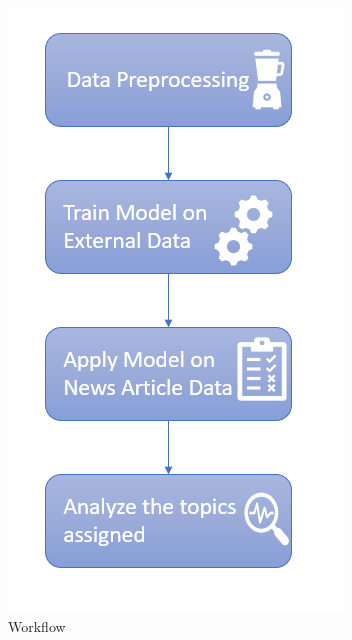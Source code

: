 \documentclass{article}
\begin{document}
    

\begin{figure}[H]
\centering
\includegraphics[scale=1]{lda_eda_process.PNG}

\caption{Workflow}
\end{figure}
\end{document}
